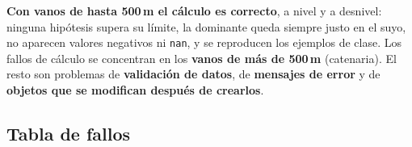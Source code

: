 \documentclass[11pt,a4paper]{article}
\newcommand{\code}[1]{\texttt{#1}}
\begin{document}
\begin{tcolorbox}[colback=ok!6, colframe=ok!70!black, title=Conclusión principal, fonttitle=\bfseries]
\textbf{Con vanos de hasta 500\,m el cálculo es correcto}, a nivel y a desnivel: ninguna hipótesis supera su límite, la dominante queda siempre justo en el suyo, no aparecen valores negativos ni \code{nan}, y se reproducen los ejemplos de clase. Los fallos de cálculo se concentran en los \textbf{vanos de más de 500\,m} (catenaria). El resto son problemas de \textbf{validación de datos}, de \textbf{mensajes de error} y de \textbf{objetos que se modifican después de crearlos}.
\end{tcolorbox}

\subsection*{Tabla de fallos}
\end{document}
